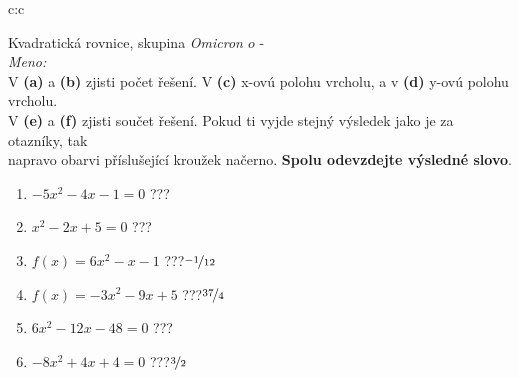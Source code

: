 \documentclass[10pt]{report}
\newcommand\omicron{o}
\begin{document}
\clearpage
\thispagestyle{empty}
\begin{tabular}{c:c}
\begin{minipage}[c][99mm][t]{0.49\linewidth}
\begin{center}
\vspace{7mm}
{\huge Kvadratická rovnice, skupina \textit{Omicron $\omicron$} -}\\[4.5mm]
\textit{Meno:}\phantom{xxxxxxxxxxxxxxxxxxxxxxxxxxxxxxxxxxxxxxxxxxxxxxxxxxxxxxxxxxxxxxxxx}\\[3.5mm]
V \textbf{(a)} a \textbf{(b)} zjisti počet řešení. V \textbf{(c)} x-ovú polohu vrcholu, a v \textbf{(d)} y-ovú polohu vrcholu.\\V \textbf{(e)} a \textbf{(f)} zjisti součet řešení. Pokud ti vyjde stejný výsledek jako je za otazníky, tak\\napravo obarvi příslušející kroužek načerno. \textbf{Spolu odevzdejte výsledné slovo}.\\[3mm]
\begin{minipage}{0.77\linewidth}
\begin{center}
\begin{varwidth}{\textwidth}
\begin{enumerate}
\large
\item $-5x^2-4x-1=0$\quad \dotfill\; ???\;\dotfill {}
\item $x^2-2x+5=0$\quad \dotfill\; ???\;\dotfill {}
\item $f(x)=6x^2-x-1$\quad \dotfill\; ???\;\dotfill \quad $\nicefrac{-1}{12}$
\item $f(x)=-3x^2-9x+5$\quad \dotfill\; ???\;\dotfill \quad $\nicefrac{37}{4}$
\item $6x^2-12x-48=0$\quad \dotfill\; ???\;\dotfill {}
\item $-8x^2+4x+4=0$\quad \dotfill\; ???\;\dotfill \quad $\nicefrac{3}{2}$
\end{enumerate}
\end{varwidth}
\end{center}
\end{minipage}

\end{center}
\end{minipage}
\end{tabular}
\end{document}
